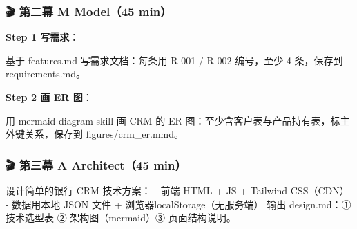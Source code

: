 \documentclass[
  american,
  chinese,
]{ctexart}
\begin{document}
\subsubsection{\texorpdfstring{\foreignlanguage{american}{🎬 }{\foreignlanguage{american}{第二幕}}\foreignlanguage{american}{ M Model}\foreignlanguage{american}{（}\foreignlanguage{american}{45 min}\foreignlanguage{american}{）}}{🎬 第二幕 M Model（45 min）}}\label{ux7b2cux4e8cux5e55-m-model45-min}

\textbf{\foreignlanguage{american}{Step
1 }}{\textbf{\foreignlanguage{american}{写需求}}}\foreignlanguage{american}{：}

{\foreignlanguage{american}{基于}}\foreignlanguage{american}{ features.md }{\foreignlanguage{american}{写需求文档：每条用}}\foreignlanguage{american}{ R-001 / R-002 }{\foreignlanguage{american}{编号，至少}}\foreignlanguage{american}{ 4 }{\foreignlanguage{american}{条，保存到}}\foreignlanguage{american}{ requirements.md}\foreignlanguage{american}{。}\foreignlanguage{american}{ }

\textbf{\foreignlanguage{american}{Step
2 }\foreignlanguage{american}{画}\foreignlanguage{american}{ ER }\foreignlanguage{american}{图}}\foreignlanguage{american}{：}

\foreignlanguage{american}{用}\foreignlanguage{american}{ mermaid-diagram skill }\foreignlanguage{american}{画}\foreignlanguage{american}{ CRM }\foreignlanguage{american}{的}\foreignlanguage{american}{ ER }{\foreignlanguage{american}{图：至少含客户表与产品持有表，标主外键关系，保存到}}\foreignlanguage{american}{ figures/{crm\_er.mmd}}\foreignlanguage{american}{。}\foreignlanguage{american}{ }

\subsubsection{\texorpdfstring{\foreignlanguage{american}{🎬 }{\foreignlanguage{american}{第三幕}}\foreignlanguage{american}{ {A} Architect}\foreignlanguage{american}{（}\foreignlanguage{american}{45 min}\foreignlanguage{american}{）}}{🎬 第三幕 A Architect（45 min）}}\label{ux7b2cux4e09ux5e55-a-architect45-min}

{\foreignlanguage{american}{设计简单的银行}}\foreignlanguage{american}{ CRM }{\foreignlanguage{american}{技术方案}}\foreignlanguage{american}{：}\foreignlanguage{american}{ - }{\foreignlanguage{american}{前端}}\foreignlanguage{american}{ HTML + JS + Tailwind CSS}\foreignlanguage{american}{（}\foreignlanguage{american}{CDN}\foreignlanguage{american}{）}\foreignlanguage{american}{ - }{\foreignlanguage{american}{数据用本地}}\foreignlanguage{american}{ JSON }{\foreignlanguage{american}{文件}}\foreignlanguage{american}{ + }{\foreignlanguage{american}{浏览器}}\foreignlanguage{american}{ {localStorage{（无服务端}}}\foreignlanguage{american}{）}\foreignlanguage{american}{ }{\foreignlanguage{american}{输出}}\foreignlanguage{american}{ design.md}\foreignlanguage{american}{：}\foreignlanguage{american}{① }{\foreignlanguage{american}{技术选型表}}\foreignlanguage{american}{ ② }{\foreignlanguage{american}{架构图（}\foreignlanguage{american}{mermaid}}\foreignlanguage{american}{）}\foreignlanguage{american}{③ }{\foreignlanguage{american}{页面结构说明}}\foreignlanguage{american}{。}\foreignlanguage{american}{ }
\end{document}
